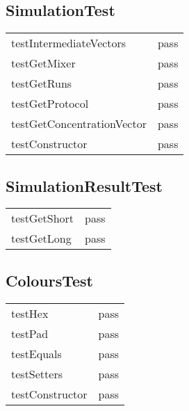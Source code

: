 \subsection*{SimulationTest}
\begin{tabular}{l|l}
testIntermediateVectors       & pass \\
testGetMixer                         & pass \\
testGetRuns                          & pass \\
testGetProtocol                     & pass \\
testGetConcentrationVector & pass \\
testConstructor                    & pass \\
\end{tabular}

\subsection*{SimulationResultTest}
\begin{tabular}{l|l}
testGetShort & pass \\
testGetLong  & pass \\
\end{tabular}

\subsection*{ColoursTest}
\begin{tabular}{l|l}
testHex             & pass \\
testPad             & pass \\
testEquals         & pass \\
testSetters        & pass \\
testConstructor & pass \\
\end{tabular}
